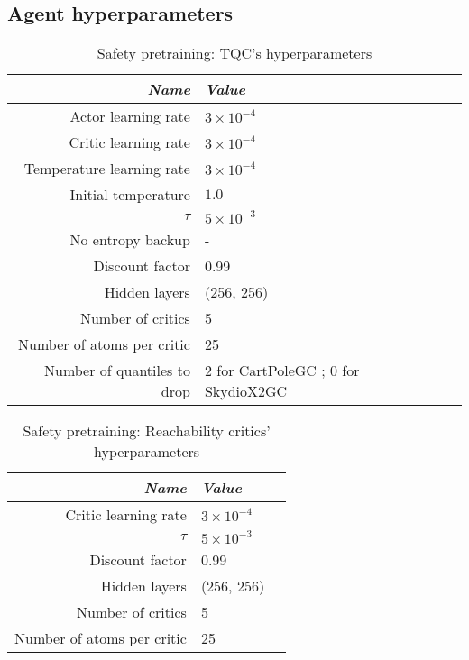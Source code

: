 \subsection{Agent hyperparameters}

\begin{table}[th]
	\caption{Safety pretraining: TQC's hyperparameters}
	\label{tab:safety_pretraining_TQC}
	\begin{tabular}{rll}
    \toprule
		\textit{Name} & \textit{Value} \\ \midrule
		Actor learning rate & $3\times 10^{-4}$  \\
		Critic learning rate & $3\times 10^{-4}$ \\
		Temperature learning rate & $3\times 10^{-4}$ \\
    Initial temperature & $1.0$ \\
    $\tau$ & $5\times 10^{-3}$ \\
		No entropy backup & -  \\
		Discount factor & 0.99  \\ 
    Hidden layers & (256, 256) \\
    Number of critics & 5 \\
    Number of atoms per critic & 25 \\
    Number of quantiles to drop & 2 for CartPoleGC ; 0 for SkydioX2GC\\
    \bottomrule
	\end{tabular}
\end{table}

\begin{table}[th]
	\caption{Safety pretraining: Reachability critics' hyperparameters}
	\label{tab:safety_pretraining_RCRL}
	\begin{tabular}{rll}
    \toprule
		\textit{Name} & \textit{Value} \\ \midrule
		Critic learning rate & $3\times 10^{-4}$ \\
    $\tau$ & $5\times 10^{-3}$ \\
		Discount factor & 0.99  \\ 
    Hidden layers & (256, 256) \\
    Number of critics & 5 \\
    Number of atoms per critic & 25 \\
    \bottomrule
	\end{tabular}
\end{table}

